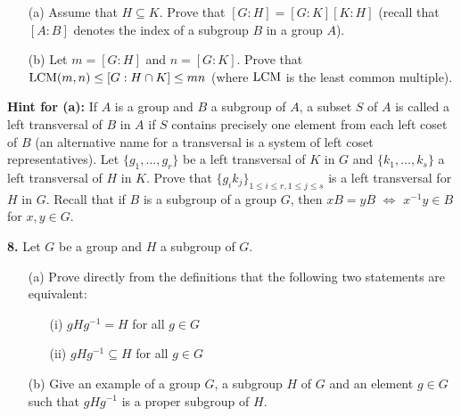 \documentclass[12pt]{amsart}
\begin{document}
\begin{itemize}

\item[(a)] Assume that $H\subseteq K$. Prove that $[G:H]=[G:K][K:H]$ (recall that $[A:B]$
denotes the index of a subgroup $B$ in a group $A$).

\item[(b)] Let $m=[G:H]$ and $n=[G:K]$. Prove that
${\rm LCM}(m,n)\leq [G:H\cap K]\leq  mn$ (where ${\rm LCM}$ is the least common multiple).
\end{itemize}


{\bf Hint for (a):} If $A$ is a group and $B$ a subgroup of $A$, a
subset $S$ of $A$ is called a left transversal of $B$ in $A$
if $S$ contains precisely one element from each left coset of $B$
(an alternative name for a transversal is a system of left coset representatives).
Let $\{g_1,\ldots, g_r\}$ be a left transversal of $K$ in $G$
and $\{k_1,\ldots, k_s\}$ a left transversal of $H$ in $K$. Prove
that $\{g_i k_j\}_{1\leq i\leq r, 1\leq j\leq s}$ is a left transversal for $H$ in $G$.
Recall that if $B$ is a subgroup of a group $G$, then $xB=yB$ $\iff$ $x^{-1}y\in B$
for $x,y\in G$.
\skv

{\bf 8.} Let $G$ be a group and $H$ a subgroup of $G$.
\begin{itemize}
\item[(a)] Prove directly from the definitions that the following two statements are equivalent:
\begin{itemize}
\item[(i)] $gHg^{-1}= H$ for all $g\in G$
\item[(ii)] $gHg^{-1}\subseteq H$ for all $g\in G$
\end{itemize}
\item[(b)] Give an example of a group $G$, a subgroup $H$ of $G$ and an element $g\in G$ such that
$gHg^{-1}$ is a proper subgroup of $H$.
\end{itemize}
 
\end{document}
